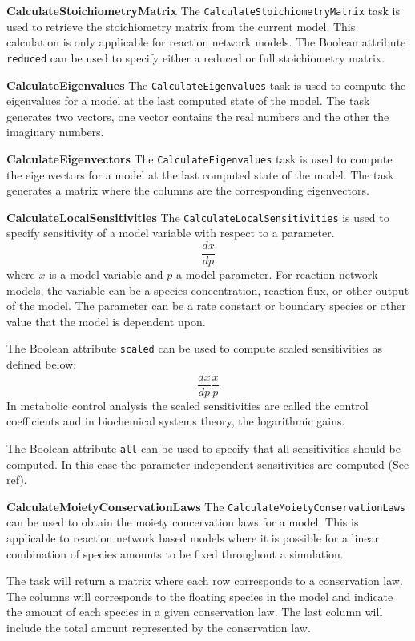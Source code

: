 {\bf CalculateStoichiometryMatrix} The {\tt CalculateStoichiometryMatrix} task is used to retrieve the stoichiometry matrix from the current model. This calculation is only applicable for reaction network models. The Boolean attribute {\tt reduced} can be used to specify either a reduced or full stoichiometry matrix. 

{\bf CalculateEigenvalues} The {\tt CalculateEigenvalues} task is used to compute the eigenvalues for a model at the last computed state of the model. The task generates two vectors, one vector contains the real numbers and the other the imaginary numbers. 

{\bf CalculateEigenvectors} The {\tt CalculateEigenvalues} task is used to compute the eigenvectors for a model at the last computed state of the model. The task generates a matrix where the columns are the corresponding eigenvectors. 

{\bf CalculateLocalSensitivities} The {\tt CalculateLocalSensitivities} is used to specify sensitivity of a model variable with respect to a parameter. 
%
$$ \frac{dx}{dp} $$
%
where $x$ is a model variable and $p$ a model parameter. For reaction network models, the variable can be a species concentration, reaction flux, or other output of the model. The parameter can be a rate constant or boundary species or other value that the model is dependent upon.

The Boolean attribute {\tt scaled} can be used to compute scaled sensitivities as defined below:
%
$$ \frac{dx}{dp} \frac{x}{p} $$
%
In metabolic control analysis the scaled sensitivities are called the control coefficients and in biochemical systems theory, the logarithmic gains. 

The Boolean attribute {\tt all} can be used to specify that all sensitivities should be computed. In this case the parameter independent sensitivities are computed (See ref). 

{\bf CalculateMoietyConservationLaws} The {\tt CalculateMoietyConservationLaws} can be used to obtain the moiety concervation laws for a model. This is applicable to reaction network based models where it is possible for a linear combination of species amounts to be fixed throughout a simulation.

The task will return a matrix where each row corresponds to a conservation law. The columns will corresponds to the floating species in the model and indicate the amount of each species in a given conservation law. The last column will include the total amount represented by the conservation law. 

